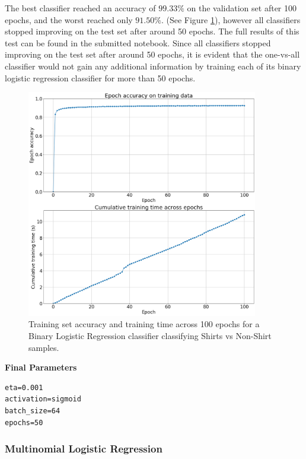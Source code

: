 \documentclass[11pt,a4paper]{article}
\begin{document}
\noindent The best classifier reached an accuracy of $99.33\%$ on the validation set after 100 epochs, and the worst reached only $91.50\%$. (See Figure \ref{fig:worst_lr_binary_classifier_100_epochs}), however all classifiers stopped improving on the test set after around 50 epochs. The full results of this test can be found in the submitted notebook. Since all classifiers stopped improving on the test set after around 50 epochs, it is evident that the one-vs-all classifier would not gain any additional information by training each of its binary logistic regression classifier for more than 50 epochs.\\

\begin{figure}[H]
    \centering
    \includegraphics[width=0.9\textwidth]{img/worst_lr_epoch_test.png}
    \caption{Training set accuracy and training time across 100 epochs for a Binary Logistic Regression classifier classifying Shirts vs Non-Shirt samples.}
    \label{fig:worst_lr_binary_classifier_100_epochs}
\end{figure}

\noindent\textbf{Final Parameters}
\begin{verbatim}
eta=0.001
activation=sigmoid
batch_size=64
epochs=50
\end{verbatim}

\pagebreak

\subsubsection*{Multinomial Logistic Regression}
\end{document}
